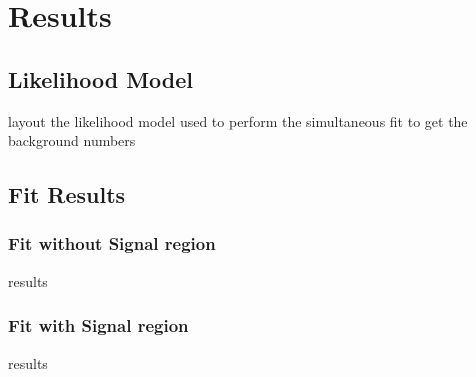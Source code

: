 \chapter{Results}

\ifpdf
    \graphicspath{{Chapter7/Figs/Raster/}{Chapter7/Figs/PDF/}{Chapter7/Figs/}}
\else
    \graphicspath{{Chapter7/Figs/Vector/}{Chapter7/Figs/}}
\fi


\section{Likelihood Model}  %
\label{sec:results_likelihood}
layout the likelihood model used to perform the simultaneous fit to get the 
background numbers

\section{Fit Results}  %
\label{sec:results_fit}

\subsection{Fit without Signal region}
results

\subsection{Fit with Signal region}
results
